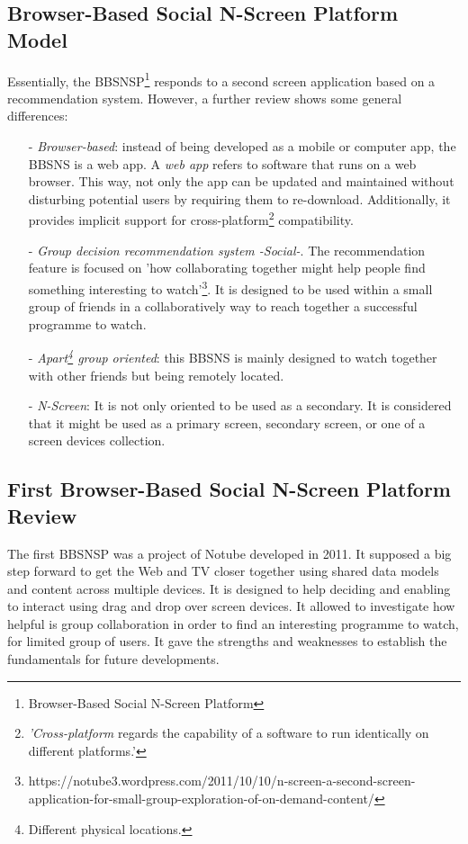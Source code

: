 \documentclass{acm_proc_article-sp}
\begin{document}
\subsection{Browser-Based Social N-Screen Platform Model}

Essentially, the BBSNSP\footnote{Browser-Based Social N-Screen Platform} responds to a second screen application based on a recommendation system. However, a further review shows some general differences:

\begin{itemize}
  	\item [-]\textit{Browser-based}: instead of being developed as a mobile or computer app, the BBSNS is a web app. A \textit{web app} refers to software that runs on a web browser. This way, not only the app can be updated and maintained without disturbing potential users by requiring them to re-download. Additionally, it provides implicit support for cross-platform\cite{web:cp}\footnote{\textit{'Cross-platform} regards the capability of a software to run identically on different platforms.'} compatibility. 
	\item [-]\textit{Group decision recommendation system -Social-}. The recommendation feature is focused on 'how collaborating together might help people find something interesting to watch'\footnote{https://notube3.wordpress.com/2011/10/10/n-screen-a-second-screen-application-for-small-group-exploration-of-on-demand-content/}. It is designed to be used within a small group of friends in a collaboratively way to reach together a successful programme to watch. 
	\item [-]\textit{Apart\footnote{Different physical locations.} group oriented}: this BBSNS is mainly designed to watch together with other friends but being remotely located. 
	\item [-]\textit{N-Screen}: It is not only oriented to be used as a secondary. It is considered that it might be used as a primary screen, secondary screen, or one of a screen devices collection. 
\end{itemize}

\subsection{First Browser-Based Social N-Screen Platform Review} \label{firstNScreen}

The first BBSNSP was a project of Notube developed in 2011. It supposed a big step forward to get the Web and TV closer together using shared data models and content across multiple devices\cite{schopman2010notube}. It is designed to help deciding and enabling to interact using drag and drop over screen devices. It allowed to investigate  how helpful is group collaboration in order to find an interesting programme to watch, for limited group of users. It gave the strengths and weaknesses to establish the fundamentals for future developments.
\end{document}
